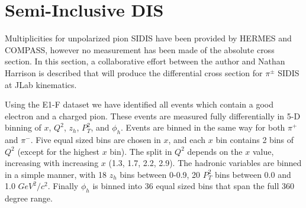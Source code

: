 \section{Semi-Inclusive DIS}

% 
%






Multiplicities for unpolarized pion SIDIS have been provided by HERMES and COMPASS, however no measurement has been made of the absolute cross section.  In this section, a collaborative effort between the author and Nathan Harrison is described that will produce the differential cross section for $\pi^{\pm}$ SIDIS at JLab kinematics.  

Using the E1-F dataset we have identified all events which contain a good electron and a charged pion.  These events are measured fully differentially in 5-D binning of $x$, $Q^2$, $z_h$, $P_{T}^{2}$, and $\phi_h$.  Events are binned in the same way for both $\pi^+$ and $\pi^-$.  Five equal sized bins are chosen in $x$, and each $x$ bin contains 2 bins of $Q^2$ (except for the highest $x$ bin).  The split in $Q^2$ depends on the $x$ value, increasing with increasing $x$ (1.3, 1.7, 2.2, 2.9).  The hadronic variables are binned in a simple manner, with 18 $z_h$ bins between 0-0.9, 20 $P_{T}^{2}$ bins between 0.0 and 1.0 $GeV^2/c^2$.  Finally $\phi_h$ is binned into 36 equal sized bins that span the full 360 degree range. \\

